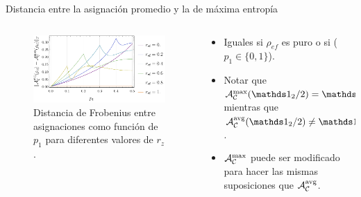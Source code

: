 \begin{frame}{Distancia entre la asignación promedio y la de máxima entropía}
    \begin{columns}
        \begin{column}{0.5\textwidth}
            \begin{figure}
                \centering
                \includegraphics[width=1.\linewidth]{figures/avg_results/dist_maxent_avg_vs_p.pdf}
                \caption{Distancia de Frobenius entre asignaciones como función de $p_{1}$ para diferentes valores de $r_{z}$.}
            \end{figure}
        \end{column}
        \begin{column}{0.5\textwidth}
            \begin{itemize}
                \item Iguales si $\rho_{ef}$ es puro o si ($p_{1}\in\{0,1\}$).\pause
                \item Notar que $\mcA_{\mcC}^{\max}(\Id_{2}/2)=\Id_{4}/4$ mientras que $\mcA_{\mcC}^{\avg}(\Id_{2}/2)\neq\Id_{4}/4$.\pause
                \item $\mathcal{A}_{\mathcal{C}}^{\max}$ puede ser modificado para hacer las mismas suposiciones que $\mathcal{A}_{\mathcal{C}}^{\text{avg}}$.\pause
            \end{itemize}
        \end{column}
    \end{columns}
\end{frame}

